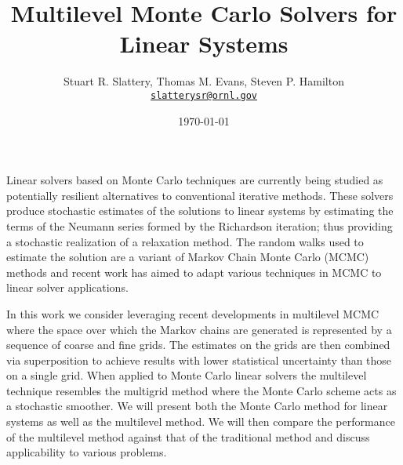 \documentclass[letterpaper,12pt]{article}
\author{Stuart R. Slattery, Thomas M. Evans, Steven P. Hamilton
\\ \href{mailto:slatterysr@ornl.gov}{\texttt{slatterysr@ornl.gov}}
}
\date{\today} \title{Multilevel Monte Carlo Solvers for Linear Systems}
\begin{document}
\maketitle

\abstract

Linear solvers based on Monte Carlo techniques are currently being
studied as potentially resilient alternatives to conventional
iterative methods. These solvers produce stochastic estimates of the
solutions to linear systems by estimating the terms of the Neumann
series formed by the Richardson iteration; thus providing a stochastic
realization of a relaxation method. The random walks used to estimate
the solution are a variant of Markov Chain Monte Carlo (MCMC) methods
and recent work has aimed to adapt various techniques in MCMC to
linear solver applications.

In this work we consider leveraging recent developments in multilevel
MCMC where the space over which the Markov chains are generated is
represented by a sequence of coarse and fine grids. The estimates on
the grids are then combined via superposition to achieve results with
lower statistical uncertainty than those on a single grid. When
applied to Monte Carlo linear solvers the multilevel technique
resembles the multigrid method where the Monte Carlo scheme acts as a
stochastic smoother. We will present both the Monte Carlo method for
linear systems as well as the multilevel method. We will then compare
the performance of the multilevel method against that of the
traditional method and discuss applicability to various problems.
\end{document}
